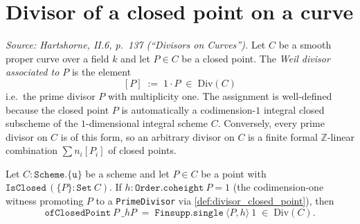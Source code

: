 \section{Divisor of a closed point on a curve}
\begin{definition}
  \label{def:divisor_closed_point}
  
  \textit{Source: Hartshorne, II.6, p.~137 (``Divisors on Curves'').}
  Let \(C\) be a smooth proper curve over a field \(k\) and let \(P \in C\) be a
  closed point. The \emph{Weil divisor associated to \(P\)} is the element
  \[
    [P] \;:=\; 1 \cdot P \;\in\; \mathrm{Div}(C)
  \]
  i.e.\ the prime divisor \(P\) with multiplicity one. The assignment is
  well-defined because the closed point \(P\) is automatically a codimension-\(1\)
  integral closed subscheme of the \(1\)-dimensional integral scheme \(C\).
  Conversely, every prime divisor on \(C\) is of this form, so an arbitrary
  divisor on \(C\) is a finite formal \(\mathbb Z\)-linear combination
  \(\sum n_i [P_i]\) of closed points.
\end{definition}
\begin{lemma}
  \label{lem:ofClosedPoint_eq_single}
  Let \(C : \texttt{Scheme.\{u\}}\) be a scheme and let \(P \in C\) be a
  point with \(\texttt{IsClosed}\,(\{P\} : \texttt{Set}\ C)\). If
  \(h : \texttt{Order.coheight}\ P = 1\) (the codimension-one witness
  promoting \(P\) to a \texttt{PrimeDivisor} via \ref{def:divisor_closed_point}),
  then
  \[
    \texttt{ofClosedPoint}\ P\ \_\!hP \;=\;
      \texttt{Finsupp.single}\ \langle P, h\rangle\ 1
      \;\in\; \mathrm{Div}(C).
  \]
\end{lemma}
